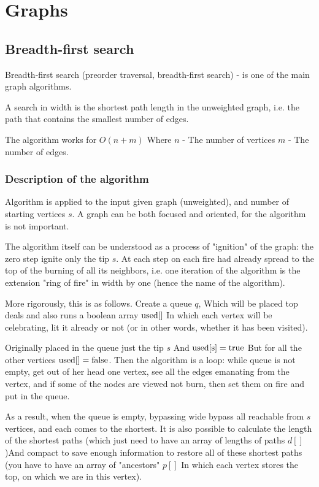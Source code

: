 \chapter{Graphs}

\section{ Breadth-first search }
Breadth-first search (preorder traversal, breadth-first search) - is one of the main graph algorithms.

A search in width is the shortest path length in the unweighted graph, i.e. the path that contains the smallest number of edges.

The algorithm works for $O (n + m)$ Where $n$ - The number of vertices $m$ - The number of edges.

\subsection{ Description of the algorithm }

Algorithm is applied to the input given graph (unweighted), and number of starting vertices $s$. A graph can be both focused and oriented, for the algorithm is not important.

The algorithm itself can be understood as a process of "ignition" of the graph: the zero step ignite only the tip $s$. At each step on each fire had already spread to the top of the burning of all its neighbors, i.e. one iteration of the algorithm is the extension "ring of fire" in width by one (hence the name of the algorithm).

More rigorously, this is as follows. Create a queue $q$, Which will be placed top deals and also runs a boolean array $\rm used []$ In which each vertex will be celebrating, lit it already or not (or in other words, whether it has been visited).

Originally placed in the queue just the tip $s$ And $\rm used [s] = true$ But for all the other vertices $\rm used [] = false$. Then the algorithm is a loop: while queue is not empty, get out of her head one vertex, see all the edges emanating from the vertex, and if some of the nodes are viewed not burn, then set them on fire and put in the queue.

As a result, when the queue is empty, bypassing wide bypass all reachable from $s$ vertices, and each comes to the shortest. It is also possible to calculate the length of the shortest paths (which just need to have an array of lengths of paths $d []$)And compact to save enough information to restore all of these shortest paths (you have to have an array of "ancestors" $p []$ In which each vertex stores the top, on which we are in this vertex).

